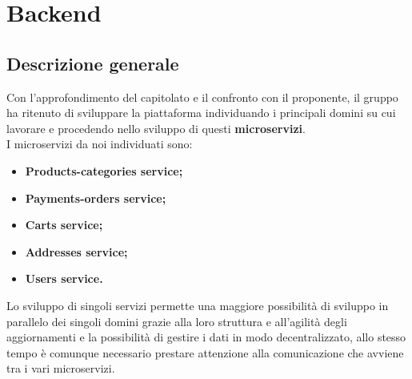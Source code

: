 \section{Backend}

\subsection{Descrizione generale}
Con l'approfondimento del capitolato e il confronto con il proponente, il gruppo ha ritenuto di sviluppare la piattaforma individuando i principali domini su cui lavorare e procedendo nello sviluppo di questi \textbf{microservizi}. \\
I microservizi da noi individuati sono:
\begin{itemize}
	\item \textbf{Products-categories service;}
	\item \textbf{Payments-orders service;}
	\item \textbf{Carts service;}
	\item \textbf{Addresses service;}
	\item \textbf{Users service.}
\end{itemize}
Lo sviluppo di singoli servizi permette una maggiore possibilità di sviluppo in parallelo dei singoli domini grazie alla loro struttura e all'agilità degli aggiornamenti e la possibilità di gestire i dati in modo decentralizzato, allo stesso tempo è comunque necessario prestare attenzione alla comunicazione che avviene tra i vari microservizi.

